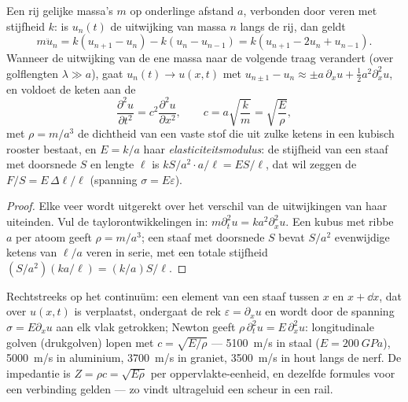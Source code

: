 \begin{proposition}\label{prop:b2:waves-on-strings:chain}
Een rij gelijke massa's $m$ op onderlinge afstand $a$, verbonden door veren
met stijfheid $k$: is $u_n(t)$ de uitwijking van massa $n$ langs de rij, dan
geldt
\[
m\ddot u_n = k(u_{n+1} - u_n) - k(u_n - u_{n-1}) = k(u_{n+1} - 2u_n + u_{n-1}) .
\]
Wanneer de uitwijking van de ene massa naar de volgende traag verandert
(over golflengten $\lambda \gg a$), gaat $u_n(t) \to u(x, t)$ met
$u_{n\pm1} - u_n \approx
\pm a\,\partial_xu + \tfrac12a^2\partial_x^2u$, en
voldoet de keten aan de 
\[
\frac{\partial^2u}{\partial t^2} = c^2\frac{\partial^2u}{\partial x^2} , \qquad
c = a\sqrt{\frac km} = \sqrt{\frac{E}{\rho}} ,
\]
met $\rho = m/a^3$ de dichtheid van een vaste stof die uit zulke ketens in
een kubisch rooster bestaat, en $E = k/a$ haar \emph{elasticiteitsmodulus}:
de stijfheid van een staaf met doorsnede $S$ en lengte $\ell$ is
$kS/a^2\cdot a/\ell = ES/\ell$, dat wil zeggen de \emph{}
$F/S = E\,\Delta\ell/\ell$ (spanning $\sigma = E\varepsilon$).
\end{proposition}

\begin{proof}
Elke veer wordt uitgerekt over het verschil van de uitwijkingen van haar
uiteinden. Vul de taylorontwikkelingen in:
$m\partial_t^2u = ka^2\partial_x^2u$. Een kubus met ribbe $a$ per atoom
geeft $\rho = m/a^3$; een staaf met doorsnede $S$ bevat $S/a^2$ evenwijdige
ketens van $\ell/a$ veren in serie, met een totale stijfheid
$(S/a^2)(ka/\ell) = (k/a)S/\ell$.
\end{proof}

\begin{proposition}\label{prop:b2:waves-on-strings:rod}
Rechtstreeks op het continuüm: een element van een staaf tussen $x$ en
$x +
\dd x$, dat over $u(x, t)$ is verplaatst, ondergaat de rek
$\varepsilon = \partial_xu$ en wordt door de spanning
$\sigma = E\partial_xu$ aan elk vlak getrokken; Newton geeft
$\rho\,\partial_t^2u =
E\,\partial_x^2u$: longitudinale golven (drukgolven)
lopen met $c = \sqrt{E/\rho}$ --- \qty{5100}{m/s} in staal
($E = \qty{200}{GPa}$), \qty{5000}{m/s} in aluminium, \qty{3700}{m/s} in
graniet, \qty{3500}{m/s} in hout langs de nerf. De impedantie is
$Z = \rho c = \sqrt{E\rho}$ per oppervlakte-eenheid, en dezelfde formules
voor een verbinding gelden --- zo vindt ultrageluid een scheur in een rail.
\end{proposition}

